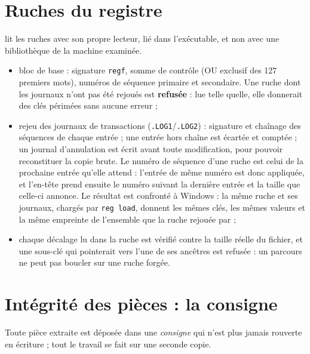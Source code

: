 \documentclass[11pt,a4paper,oneside]{report}
\begin{document}
\section{Ruches du registre}

\wac{} lit les ruches avec son propre lecteur, lié dans l'exécutable, et non
avec une bibliothèque de la machine examinée.

\begin{itemize}
  \item bloc de base : signature \texttt{regf}, somme de contrôle (OU exclusif
    des 127 premiers mots), numéros de séquence primaire et secondaire. Une
    ruche dont les journaux n'ont pas été rejoués est \textbf{refusée} : lue
    telle quelle, elle donnerait des clés périmées sans aucune erreur ;
  \item rejeu des journaux de transactions (\texttt{.LOG1}/\texttt{.LOG2}) :
    signature et chaînage des séquences de chaque entrée ; une entrée hors
    chaîne est écartée et comptée ; un journal d'annulation est écrit avant
    toute modification, pour pouvoir reconstituer la copie brute. Le numéro de
    séquence d'une ruche est celui de la prochaine entrée qu'elle attend :
    l'entrée de même numéro est donc appliquée, et l'en-tête prend ensuite le
    numéro suivant la dernière entrée et la taille que celle-ci annonce. Le
    résultat est confronté à Windows : la même ruche et ses journaux, chargés
    par \texttt{reg load}, donnent les mêmes clés, les mêmes valeurs et la
    même empreinte de l'ensemble que la ruche rejouée par \wac{} ;
  \item chaque décalage lu dans la ruche est vérifié contre la taille réelle du
    fichier, et une sous-clé qui pointerait vers l'une de ses ancêtres est
    refusée : un parcours ne peut pas boucler sur une ruche forgée.
\end{itemize}

\section{Intégrité des pièces : la consigne}

Toute pièce extraite est déposée dans une \emph{consigne} qui n'est plus jamais
rouverte en écriture ; tout le travail se fait sur une seconde copie.
\end{document}
